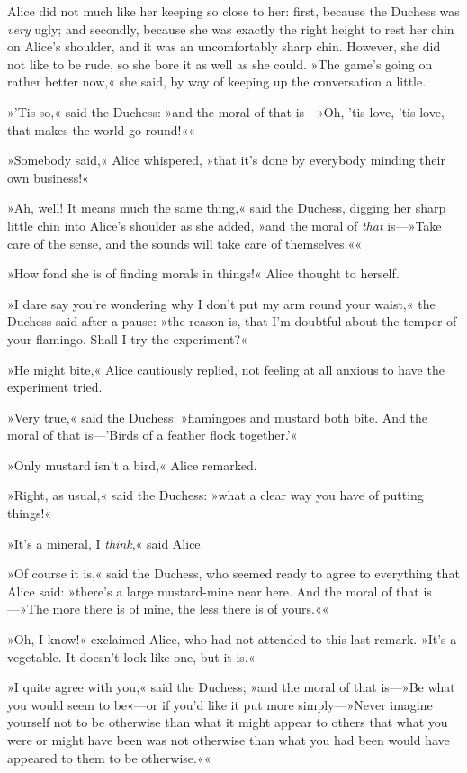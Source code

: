 Alice did not much like her keeping so close to her: first, because the Duchess was \textit{very} ugly; and secondly, because she was exactly the right height to rest her chin on Alice's shoulder, and it was an uncomfortably sharp chin. However, she did not like to be rude, so she bore it as well as she could. »The game's going on rather better now,« she said, by way of keeping up the conversation a little.

»'Tis so,« said the Duchess: »and the moral of that is—»Oh, 'tis love, 'tis love, that makes the world go round!««

»Somebody said,« Alice whispered, »that it's done by everybody minding their own business!«

»Ah, well! It means much the same thing,« said the Duchess, digging her sharp little chin into Alice's shoulder as she added, »and the moral of \textit{that} is—»Take care of the sense, and the sounds will take care of themselves.««

»How fond she is of finding morals in things!« Alice thought to herself.

»I dare say you're wondering why I don't put my arm round your waist,« the Duchess said after a pause: »the reason is, that I'm doubtful about the temper of your flamingo. Shall I try the experiment?«

»He might bite,« Alice cautiously replied, not feeling at all anxious to have the experiment tried.

»Very true,« said the Duchess: »flamingoes and mustard both bite. And the moral of that is—'Birds of a feather flock together.'«

»Only mustard isn't a bird,« Alice remarked.

»Right, as usual,« said the Duchess: »what a clear way you have of putting things!«

»It's a mineral, I \textit{think},« said Alice.

»Of course it is,« said the Duchess, who seemed ready to agree to everything that Alice said: »there's a large mustard-mine near here. And the moral of that is—»The more there is of mine, the less there is of yours.««

»Oh, I know!« exclaimed Alice, who had not attended to this last remark. »It's a vegetable. It doesn't look like one, but it is.«

»I quite agree with you,« said the Duchess; »and the moral of that is—»Be what you would seem to be«—or if you'd like it put more simply—»Never imagine yourself not to be otherwise than what it might appear to others that what you were or might have been was not otherwise than what you had been would have appeared to them to be otherwise.««

